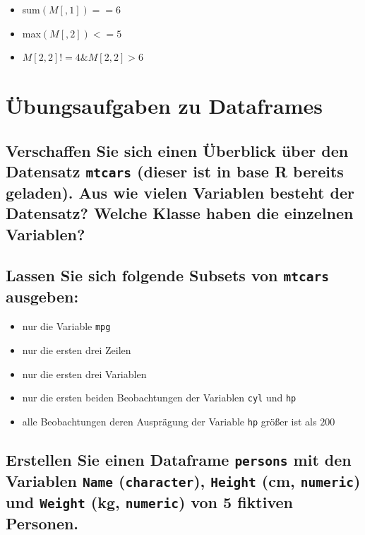 \documentclass[12pt,a4paper]{article}
\begin{document}
\begin{itemize}
  \item sum$(M[ , 1]) == 6$
  \item max$(M[ , 2]) <= 5$
  \item $M[2, 2] != 4 \& M[2, 2] > 6$
\end{itemize}

\section{Übungsaufgaben zu
Dataframes}\label{uxfcbungsaufgaben-zu-dataframes}

\subsection{\texorpdfstring{Verschaffen Sie sich einen Überblick über
den Datensatz \texttt{mtcars} (dieser ist in base R bereits geladen).
Aus wie vielen Variablen besteht der Datensatz? Welche Klasse haben die
einzelnen
Variablen?}{Verschaffen Sie sich einen Überblick über den Datensatz  (dieser ist in base R bereits geladen). Aus wie vielen Variablen besteht der Datensatz? Welche Klasse haben die einzelnen Variablen?}}\label{verschaffen-sie-sich-einen-uxfcberblick-uxfcber-den-datensatz-dieser-ist-in-base-r-bereits-geladen.-aus-wie-vielen-variablen-besteht-der-datensatz-welche-klasse-haben-die-einzelnen-variablen}

\subsection{\texorpdfstring{Lassen Sie sich folgende Subsets von
\texttt{mtcars}
ausgeben:}{Lassen Sie sich folgende Subsets von  ausgeben:}}\label{lassen-sie-sich-folgende-subsets-von-ausgeben}

\begin{itemize}
  \item nur die Variable \texttt{mpg}
  \item nur die ersten drei Zeilen
  \item nur die ersten drei Variablen
  \item nur die ersten beiden Beobachtungen der Variablen \texttt{cyl} und \texttt{hp}
  \item alle Beobachtungen deren Ausprägung der Variable \texttt{hp} größer ist als $200$
\end{itemize}

\subsection{\texorpdfstring{Erstellen Sie einen Dataframe
\texttt{persons} mit den Variablen \texttt{Name} (\texttt{character}),
\texttt{Height} (cm, \texttt{numeric}) und \texttt{Weight} (kg,
\texttt{numeric}) von 5 fiktiven
Personen.}{Erstellen Sie einen Dataframe  mit den Variablen  (),  (cm, ) und  (kg, ) von 5 fiktiven Personen.}}\label{erstellen-sie-einen-dataframe-mit-den-variablen-cm-und-kg-von-5-fiktiven-personen.}
\end{document}
